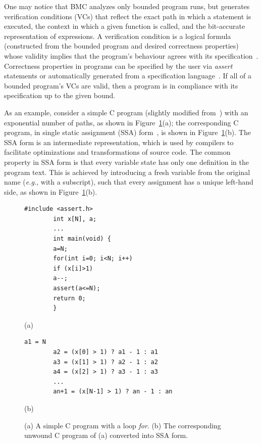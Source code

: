 \documentclass{cta-author}
\begin{document}
One may notice that BMC analyzes only bounded program runs, but generates verification conditions (VCs) that reflect the exact path in which a statement is executed, the context in which a given function is called, and the bit-accurate representation of expressions. A verification condition is a logical formula (constructed from the bounded program and desired correctness properties) whose validity implies that the program's behaviour agrees with its specification~\cite{Bradley07}. Correctness properties in programs can be specified by the user via \textit{assert} statements or automatically generated from a specification language~\cite{Thomas01}. If all of a bounded program's VCs are valid, then a program is in compliance with its specification up to the given bound.

As an example, consider a simple C program (slightly modified from~\cite{Strichman08}) with an exponential number of paths, as shown in Figure~\ref{figure:verification-condition}(a); the corresponding C program, in single static assignment (SSA) form~\cite{Appel97}, is shown in Figure~\ref{figure:verification-condition}(b). The SSA form is an intermediate representation, which is used by compilers to facilitate optimizations and transformations of source code. The common property in SSA form is that every variable state has only one definition in the program text. This is achieved by introducing a fresh variable from the original name ({\it e.g.}, with a subscript), such that every assignment has a unique left-hand side, as shown in Figure~\ref{figure:verification-condition}(b).
%
\begin{figure}[ht]
	\centering
	\begin{minipage}{\columnwidth}
		\begin{lstlisting}[basicstyle=\footnotesize]
		#include <assert.h>
		int x[N], a;
		...
		int main(void) {
		a=N;
		for(int i=0; i<N; i++)
		if (x[i]>1)
		a--;
		assert(a<=N);
		return 0;
		}
		\end{lstlisting}
	\end{minipage}
	\begin{center}
		(a)
	\end{center}
	\centering
	\begin{minipage}{0.4\textwidth}
		\begin{lstlisting}[basicstyle=\footnotesize]
		a1 = N
		a2 = (x[0] > 1) ? a1 - 1 : a1
		a3 = (x[1] > 1) ? a2 - 1 : a2
		a4 = (x[2] > 1) ? a3 - 1 : a3
		...
		an+1 = (x[N-1] > 1) ? an - 1 : an 
		\end{lstlisting}
	\end{minipage}
	\begin{center}
		(b)
	\end{center}
	\caption{(a) A simple C program with a loop \textit{for}. (b) The corresponding unwound C program of (a) converted into SSA form.} 
	\label{figure:verification-condition}
\end{figure}
\end{document}
